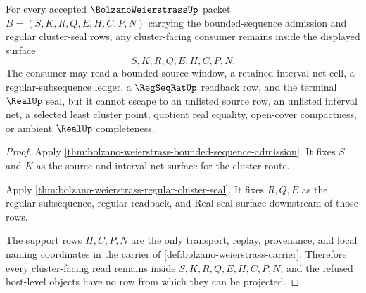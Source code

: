 \begin{theorem}
\label{thm:bolzano-weierstrass-cluster-seal-nonescape}
For every accepted $\BolzanoWeierstrassUp$ packet $B=(S,K,R,Q,E,H,C,P,N)$ carrying the bounded-sequence admission and regular cluster-seal rows, any cluster-facing consumer remains inside the displayed surface
$$
S,K,R,Q,E,H,C,P,N .
$$
The consumer may read a bounded source window, a retained interval-net cell, a regular-subsequence ledger, a $\RegSeqRatUp$ readback row, and the terminal $\RealUp$ seal, but it cannot escape to an unlisted source row, an unlisted interval net, a selected least cluster point, quotient real equality, open-cover compactness, or ambient $\RealUp$ completeness.
\end{theorem}
\begin{proof}
Apply \autoref{thm:bolzano-weierstrass-bounded-sequence-admission}. It fixes $S$ and $K$ as the source and interval-net surface for the cluster route.

Apply \autoref{thm:bolzano-weierstrass-regular-cluster-seal}. It fixes $R,Q,E$ as the regular-subsequence, regular readback, and Real-seal surface downstream of those rows.

The support rows $H,C,P,N$ are the only transport, replay, provenance, and local naming coordinates in the carrier of \autoref{def:bolzano-weierstrass-carrier}. Therefore every cluster-facing read remains inside $S,K,R,Q,E,H,C,P,N$, and the refused host-level objects have no row from which they can be projected.
\end{proof}

